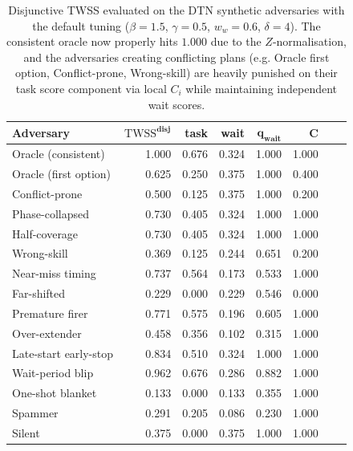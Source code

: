 \documentclass[11pt]{article}
\newcommand{\TWSS}{\mathrm{TWSS}}
\begin{document}
\begin{table}[ht]
\centering
\small
\begin{tabular}{lrrrrrrr}
\toprule
\textbf{Adversary} & $\bm{\TWSS^{\text{disj}}}$ & \textbf{task} & \textbf{wait} & $\bm{q_{\text{wait}}}$ & $\bm{C}$ \\
\midrule
Oracle (consistent) & 1.000 & 0.676 & 0.324 & 1.000 & 1.000 \\
Oracle (first option) & 0.625 & 0.250 & 0.375 & 1.000 & 0.400 \\
Conflict-prone & 0.500 & 0.125 & 0.375 & 1.000 & 0.200 \\
Phase-collapsed & 0.730 & 0.405 & 0.324 & 1.000 & 1.000 \\
Half-coverage & 0.730 & 0.405 & 0.324 & 1.000 & 1.000 \\
Wrong-skill & 0.369 & 0.125 & 0.244 & 0.651 & 0.200 \\
Near-miss timing & 0.737 & 0.564 & 0.173 & 0.533 & 1.000 \\
Far-shifted & 0.229 & 0.000 & 0.229 & 0.546 & 0.000 \\
Premature firer & 0.771 & 0.575 & 0.196 & 0.605 & 1.000 \\
Over-extender & 0.458 & 0.356 & 0.102 & 0.315 & 1.000 \\
Late-start early-stop & 0.834 & 0.510 & 0.324 & 1.000 & 1.000 \\
Wait-period blip & 0.962 & 0.676 & 0.286 & 0.882 & 1.000 \\
One-shot blanket & 0.133 & 0.000 & 0.133 & 0.355 & 1.000 \\
Spammer & 0.291 & 0.205 & 0.086 & 0.230 & 1.000 \\
Silent & 0.375 & 0.000 & 0.375 & 1.000 & 1.000 \\
\bottomrule
\end{tabular}
\caption{Disjunctive TWSS evaluated on the DTN synthetic adversaries
with the default tuning ($\beta{=}1.5$, $\gamma{=}0.5$, $w_w{=}0.6$, $\delta{=}4$).
The consistent oracle now properly hits $1.000$ due to the $Z$-normalisation, and
the adversaries creating conflicting plans (e.g. Oracle first option, Conflict-prone, Wrong-skill) are heavily punished on their task score component via local $C_i$ while maintaining independent wait scores.}
\label{tab:dtn-adversaries}
\end{table}
\end{document}
